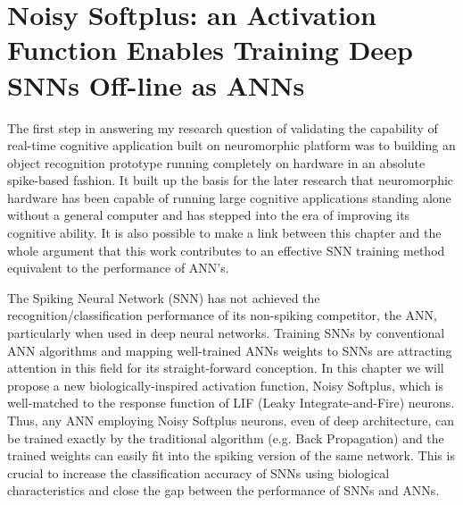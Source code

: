 \chapter{Noisy Softplus: an Activation Function Enables Training Deep SNNs Off-line as ANNs}
\label{cha:Conv}
The first step in answering my research question of validating the capability of real-time cognitive application built on neuromorphic platform was to building an object recognition prototype running completely on hardware in an absolute spike-based fashion.
It built up the basis for the later research that neuromorphic hardware has been capable of running large cognitive applications standing alone without a general computer and has stepped into the era of improving its cognitive ability.
It is also possible to make a link between this chapter and the whole argument that this work contributes to an effective SNN training method equivalent to the performance of ANN's.

The Spiking Neural Network (SNN) has not achieved the recognition/classification performance of its non-spiking competitor, the ANN, particularly when used in deep neural networks.
Training SNNs by conventional ANN algorithms and mapping well-trained ANNs weights to SNNs are attracting attention in this field for its straight-forward conception.
In this chapter we will propose a new biologically-inspired activation function, Noisy Softplus, which is well-matched to the response function of LIF (Leaky Integrate-and-Fire) neurons.
Thus, any ANN employing Noisy Softplus neurons, even of deep architecture, can be trained exactly by the traditional algorithm (e.g. Back Propagation) and the trained weights can easily fit into the spiking version of the same network.
This is crucial to increase the classification accuracy of SNNs using biological characteristics and close the gap between the performance of SNNs and ANNs.


